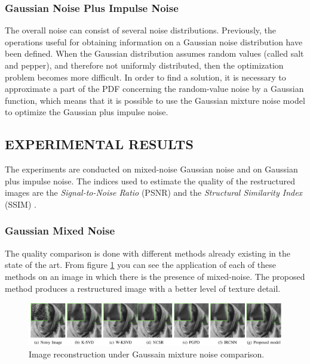 \subsubsection{Gaussian Noise Plus Impulse Noise}
The overall noise can consist of several noise distributions. Previously, the 
operations useful for obtaining information on a Gaussian noise distribution 
have been defined. When the Gaussian distribution assumes random values 
(called salt and pepper), and therefore not uniformly distributed, then the 
optimization problem becomes more difficult. In order to find a solution, it 
is necessary to approximate a part of the PDF concerning the random-value 
noise by a Gaussian function, which means that it is possible to use the 
Gaussian mixture noise model to optimize the Gaussian plus impulse noise.

\subsection{EXPERIMENTAL RESULTS}
The experiments are conducted on mixed-noise Gaussian noise and on Gaussian 
plus impulse noise. The indices used to estimate the quality of the restructured
images are the \emph{Signal-to-Noise Ratio} (PSNR) and the \emph{Structural 
Similarity Index} (SSIM) \cite{0884882841}.

\subsubsection{Gaussian Mixed Noise}
The quality comparison is done with different methods already existing in 
the state of the art. From figure \ref{fig:GMNComp} you can see the application of 
each of these methods on an image in which there is the presence of mixed-noise. 
The proposed method produces a restructured image with a better level of 
texture detail.
\begin{figure}[h!]
    \centering
    \includegraphics[width = \linewidth]{images/paper7/GMN comparison.png}
    \centering
    \caption{Image reconstruction under Gaussain mixture noise comparison.}
    \label{fig:GMNComp}
\end{figure}

